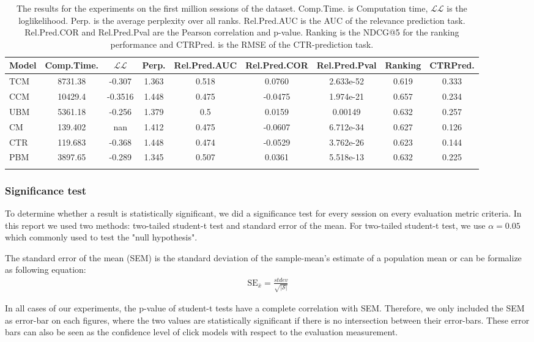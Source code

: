 \begin{table}
	\centering
	\begin{tabular}{lcccccccc}
		\toprule
		Model	&	Comp.Time.	&	$\mathcal{LL}$	&	Perp.	&	Rel.Pred.AUC	&	Rel.Pred.COR	&	Rel.Pred.Pval	&	Ranking	&	CTRPred. \\ \midrule
		TCM	&	8731.38	&	-0.307	&	1.363	&	0.518	&	0.0760	&	2.633e-52	&	0.619	&	0.333 \\
		CCM	&	10429.4	&	-0.3516	&	1.448	&	0.475	&	-0.0475	&	1.974e-21	&	0.657	&	0.234 \\
		UBM	&	5361.18	&	-0.256	&	1.379	&	0.5		&	0.0159	&	0.00149		&	0.632	&	0.257 \\
		CM	&	139.402	&	nan		&	1.412	&	0.475	&	-0.0607	&	6.712e-34	&	0.627	&	0.126 \\
		CTR	&	119.683	&	-0.368	&	1.448	&	0.474	&	-0.0529	&	3.762e-26	&	0.623	&	0.144 \\
		PBM	&	3897.65	&	-0.289	&	1.345	&	0.507	&	0.0361	&	5.518e-13	&	0.632	&	0.225 \\ \bottomrule \\
	\end{tabular}
	\caption{The results for the experiments on the first million sessions of the dataset. Comp.Time. is Computation time, $\mathcal{LL}$ is the loglikelihood. Perp. is the average perplexity over all ranks. Rel.Pred.AUC is the AUC of the relevance prediction task. Rel.Pred.COR and Rel.Pred.Pval are the Pearson correlation and p-value. Ranking is the NDCG@5 for the ranking performance and CTRPred. is the RMSE of the CTR-prediction task.}
	\label{table:results}
\end{table}

\subsubsection{Significance test}
To determine whether a result is statistically significant, we did a significance test for every session on every evaluation metric criteria. In this report we used two methods: two-tailed student-t test and standard error of the mean. For two-tailed student-t test, we use $\alpha = 0.05$ which commonly used to test the "null hypothesis". 

The standard error of the mean (SEM) is the standard deviation of the sample-mean's estimate of a population mean or can be formalize as following equation:
\begin{align*}
	\text{SE}_{\bar{x}} = \frac{stdev}{\sqrt{|\mathcal{S}|}}
\end{align*}

In all cases of our experiments, the p-value of student-t tests have a complete correlation with SEM.
Therefore, we only included the SEM as error-bar on each figures, where the two values are statistically significant if there is no intersection between their error-bars.
These error bars can also be seen as the confidence level of click models with respect to the evaluation measurement.